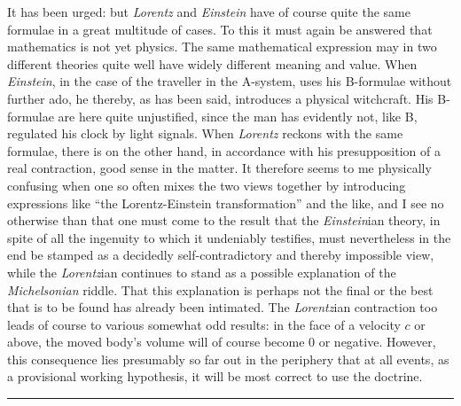 \documentclass[12pt,a4paper]{article}
\begin{document}
It has been urged: but \emph{Lorentz} and \emph{Einstein} have of course quite
the same formulae in a great multitude of cases. To this it must again be
answered that mathematics is not yet physics. The same mathematical expression
may in two different theories quite well have widely different meaning and
value. When \emph{Einstein}, in the case of the traveller in the A-system,
uses his B-formulae without further ado, he thereby, as has been said,
introduces a physical witchcraft. His B-formulae are here quite unjustified,
since the man has evidently not, like B, regulated his clock by light signals.
When \emph{Lorentz} reckons with the same formulae, there is on the other
hand, in accordance with his presupposition of a real contraction, good sense
in the matter. It therefore seems to me physically confusing when one so often
mixes the two views together by introducing expressions like ``the
Lorentz-Einstein transformation'' and the like, and I see no otherwise than
that one must come to the result that the \emph{Einstein}ian theory, in spite
of all the ingenuity to which it undeniably testifies, must nevertheless in
the end be stamped as a decidedly self-contradictory and thereby impossible
view, while the \emph{Lorentz}ian continues to stand as a possible explanation
of the \emph{Michelsonian} riddle. That this explanation is perhaps not the
final or the best that is to be found has already been intimated. The
\emph{Lorentz}ian contraction too leads of course to various somewhat odd
results: in the face of a velocity $c$ or above, the moved body's volume will
of course become 0 or negative. However, this consequence lies presumably so
far out in the periphery that at all events, as a provisional working
hypothesis, it will be most correct to use the doctrine.

\begin{center}
\rule{0.16\textwidth}{0.5pt}
\end{center}
\end{document}

